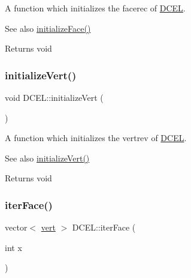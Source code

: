 A function which initializes the facerec of \hyperlink{class_d_c_e_l}{D\+C\+EL}. 

\begin{DoxySeeAlso}{See also}
\hyperlink{class_d_c_e_l_a886263abba0d84b7e459a6acb5c594ae}{initialize\+Face()} 
\end{DoxySeeAlso}
\begin{DoxyReturn}{Returns}
void 
\end{DoxyReturn}
\mbox{\label{class_d_c_e_l_ab53853e31a8715a783d4b92b37aabdfc}} 
\subsubsection{\texorpdfstring{initialize\+Vert()}{initializeVert()}}
{\footnotesize\ttfamily void D\+C\+E\+L\+::initialize\+Vert (\begin{DoxyParamCaption}{ }\end{DoxyParamCaption})\hspace{0.3cm}{\ttfamily [inline]}}



A function which initializes the vertrev of \hyperlink{class_d_c_e_l}{D\+C\+EL}. 

\begin{DoxySeeAlso}{See also}
\hyperlink{class_d_c_e_l_ab53853e31a8715a783d4b92b37aabdfc}{initialize\+Vert()} 
\end{DoxySeeAlso}
\begin{DoxyReturn}{Returns}
void 
\end{DoxyReturn}
\mbox{\label{class_d_c_e_l_a746b067777dfc25859a7082f27a1364e}} 
\subsubsection{\texorpdfstring{iter\+Face()}{iterFace()}}
{\footnotesize\ttfamily vector$<$ \hyperlink{_polygon_triangulation_8h_a15bccd83c1e570e4a0ff17c42152989b}{vert} $>$ D\+C\+E\+L\+::iter\+Face (\begin{DoxyParamCaption}\item[{int}]{x }\end{DoxyParamCaption})\hspace{0.3cm}{\ttfamily [inline]}}




